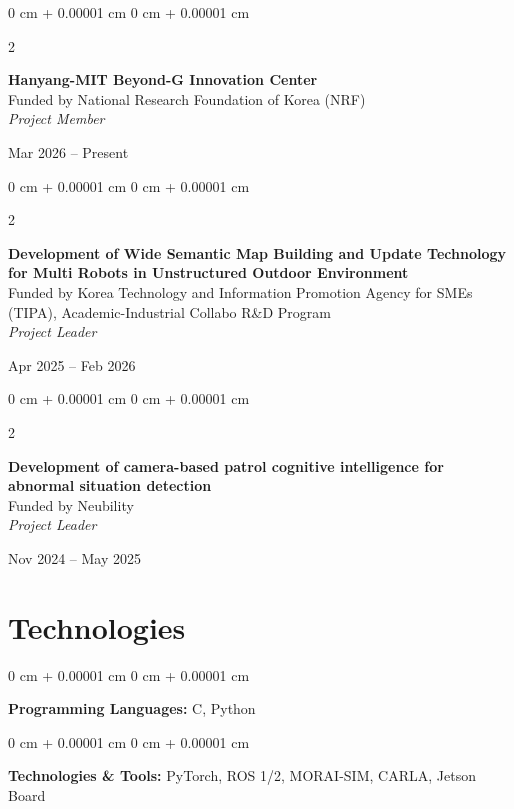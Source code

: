 \documentclass[10pt, letterpaper]{article}
\newenvironment{onecolentry}{
    \begin{adjustwidth}{
        0 cm + 0.00001 cm
    }{
        0 cm + 0.00001 cm
    }
}{
    \end{adjustwidth}
} %
\newenvironment{twocolentry}[2][]{
    \onecolentry
    \def\secondColumn{#2}
    \setcolumnwidth{\fill, 4.5 cm}
    \begin{paracol}{2}
}{
    \switchcolumn \raggedleft \secondColumn
    \end{paracol}
    \endonecolentry
} %
\begin{document}
        \vspace{0.2 cm}

        \begin{twocolentry}{Mar 2026 -- Present}
            \textbf{Hanyang-MIT Beyond-G Innovation Center} \\
            {\small Funded by National Research Foundation of Korea (NRF)} \\
            \textit{Project Member}
        \end{twocolentry}

        \vspace{0.2 cm}

        \begin{twocolentry}{Apr 2025 -- Feb 2026}
            \textbf{Development of Wide Semantic Map Building and Update Technology for Multi Robots in Unstructured Outdoor Environment} \\
            {\small Funded by Korea Technology and Information Promotion Agency for SMEs (TIPA), Academic-Industrial Collabo R\&D Program} \\
            \textit{Project Leader}
        \end{twocolentry}

        \vspace{0.2 cm}

        \begin{twocolentry}{Nov 2024 -- May 2025}
            \textbf{Development of camera-based patrol cognitive intelligence for abnormal situation detection} \\
            {\small Funded by Neubility} \\
            \textit{Project Leader}
        \end{twocolentry}

    
    \section{Technologies}



        
        \begin{onecolentry}
          \textbf{Programming Languages:} C, Python
        \end{onecolentry}
        
        \vspace{0.2 cm}
        
        \begin{onecolentry}
          \textbf{Technologies \& Tools:} PyTorch, ROS 1/2, MORAI-SIM, CARLA, Jetson Board
        \end{onecolentry}


    
\end{document}
